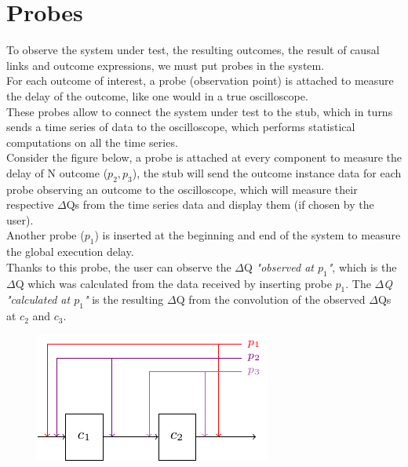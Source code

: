 \section{Probes}

To observe the system under test, the resulting outcomes, the result of causal links and outcome expressions, we must put probes in the system. \\
For each outcome of interest, a probe (observation point) is attached to measure the delay of the outcome, like one would in a true oscilloscope. \\
These probes allow to connect the system under test to the stub, which in turns sends a time series of data to the oscilloscope, which performs statistical computations on all the time series. \\
    Consider the figure below, a probe is attached at every component to measure the delay of N outcome ($p_2, p_3$), the stub will send the outcome instance data for each probe observing an outcome to the oscilloscope, which will measure their respective $\Delta$Qs from the time series data and display them (if chosen by the user). \\
    Another probe ($p_1$) is inserted at the beginning and end of the system to measure the global execution delay. \\
    Thanks to this probe, the user can observe the $\Delta$Q \textit{"observed at $p_1$"}, which is the $\Delta$Q which was calculated from the data received by inserting probe $p_1$. The \textit{$\Delta$Q "calculated at $p_1$"} is the resulting $\Delta$Q from the convolution of the observed $\Delta$Qs at $c_2$ and $c_3$.   
    \begin{figure}[H]
        \begin{center}
            \includegraphics[scale=1.8]{tikz/probes.pdf}
        \end{center}
    \end{figure}
